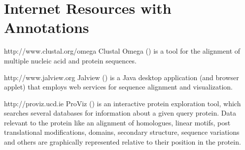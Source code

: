 \documentclass[12pt]{article}
\begin{document}
\section*{Internet Resources with Annotations}%
\label{internet-resources-with-annotations}

http://www.clustal.org/omega Clustal Omega (\cite{21988835}) is a tool
for the alignment of multiple nucleic acid and protein sequences.

http://www.jalview.org Jalview (\cite{19151095}) is a Java desktop
application (and browser applet) that employs web services for sequence
alignment and visualization.

http://proviz.ucd.ie ProViz (\cite{27085803}) is an interactive protein
exploration tool, which searches several databases for information about
a given query protein. Data relevant to the protein like an alignment of
homologues, linear motifs, post translational modifications, domains,
secondary structure, sequence variations and others are graphically
represented relative to their position in the protein.



\end{document}
